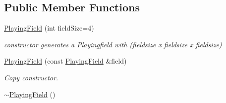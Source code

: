 \subsection*{Public Member Functions}
\begin{DoxyCompactItemize}
\item 
\hyperlink{classPlayingField_a9cd7d0540bff01b5b83ca9bdf8dfd5d6}{Playing\-Field} (int field\-Size=4)
\begin{DoxyCompactList}\small\item\em constructor generates a Playingfield with (fieldsize x fieldsize x fieldsize) \end{DoxyCompactList}\item 
\hypertarget{classPlayingField_a4715051a7ba2b0495b3b56d357563432}{\hyperlink{classPlayingField_a4715051a7ba2b0495b3b56d357563432}{Playing\-Field} (const \hyperlink{classPlayingField}{Playing\-Field} \&field)}\label{classPlayingField_a4715051a7ba2b0495b3b56d357563432}

\begin{DoxyCompactList}\small\item\em Copy constructor. \end{DoxyCompactList}\item 
\hypertarget{classPlayingField_a7bc092c6433f18e7a07835608e8a4449}{\hyperlink{classPlayingField_a7bc092c6433f18e7a07835608e8a4449}{$\sim$\-Playing\-Field} ()}\label{classPlayingField_a7bc092c6433f18e7a07835608e8a4449}


\end{DoxyCompactItemize}
